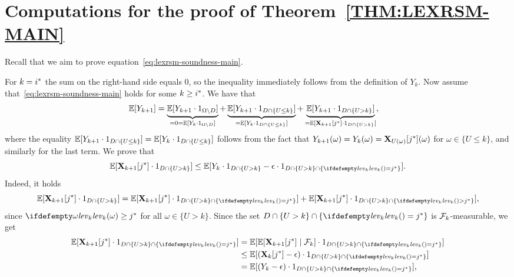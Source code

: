 
\section{Computations for the proof of Theorem~\ref{THM:LEXRSM-MAIN}}

Recall that we aim to prove equation~\eqref{eq:lexrsm-soundness-main}.

For 
$k={i}^*$ the sum on the right-hand side equals $0$, so the 
inequality immediately follows from the definition of $Y_k$. Now assume 
that~\eqref{eq:lexrsm-soundness-main} holds for some $k\geq {i}^*$. We have that 
\begin{align}
\label{eq:lexrsm-ind-1}
\mathbb{E}[Y_{k+1}] &= \underbrace{\mathbb{E}[Y_{k+1}\cdot {1}_{\Omega\setminus D}]}_{=0=\mathbb{E}[Y_k\cdot{1}_{\Omega\setminus D}]} +  \underbrace{\mathbb{E}[Y_{k+1}\cdot {1}_{D \cap \{U \leq k\}}]}_{=\mathbb{E}[Y_k\cdot{1}_{D\cap \{U\leq k\}}]} + \underbrace{\mathbb{E}[Y_{k+1}\cdot {1}_{D \cap \{U > k\}}]}_{=\mathbb{E}[\mathbf{X}_{k+1}[{j}^*]\cdot{1}_{D\cap \{U>k \} }]},
\end{align}
where the equality $\mathbb{E}[Y_{k+1}\cdot {1}_{D \cap \{U \leq k\}}] =\mathbb{E}[Y_k\cdot{1}_{D\cap \{U\leq k\}}] $ follows from the fact that $Y_{k+1}(\omega)=Y_k({\omega})=\mathbf{X}_{U(\omega)}[{j}^*](\omega)$ for $\omega\in \{U\leq k\}$, and similarly for the last term. We prove that 
\begin{equation}
\label{eq:lexrsm-ind-2}
\E[\vecseq{X}{k+1}{\fixn{j}}\cdot \indicator{D\cap \{U > k \}}] \leq \E[Y_k\cdot \indicator{D\cap \{U > k \}} -\eps\cdot \indicator{D\cap \{U>k\} \cap \{\levelrank{}{k}= \fixn{j}\} }] .
\end{equation}
Indeed, it holds
\begin{equation}
\label{eq:lexrsm-ind-3}
\E[\vecseq{X}{k+1}{\fixn{j}}\cdot \indicator{D\cap \{U > k \}}] = \E[\vecseq{X}{k+1}{\fixn{j}}\cdot \indicator{D\cap \{U > k \} \cap \{\levelrank{}{k}=\fixn{j} \} }]  + \E[\vecseq{X}{k+1}{\fixn{j}}\cdot \indicator{D\cap \{U > k \} \cap \{\levelrank{}{k}>\fixn{j}\} }], 
\end{equation}
since $\levelrank{\omega}{k}\geq \fixn{j}$ for all $\omega \in \{U>k\}$. Since the set $D\cap \{U > k \} \cap \{\levelrank{}{k}=\fixn{j} \}$ is $\mathcal{F}_k$-measurable, we get
\begin{align}
\E[\vecseq{X}{k+1}{\fixn{j}}\cdot \indicator{D\cap \{U > k \} \cap \{\levelrank{}{k}=\fixn{j} \} }] &= \E[\E[\vecseq{X}{k+1}{\fixn{j}}\mid \genfilt_k]\cdot \indicator{D\cap \{U > k \} \cap \{\levelrank{}{k}=\fixn{j} \} }] \label{eq:lexrsm-ind-4}\\
&\leq \E[(\vecseq{X}{k}{\fixn{j}} - \eps)\cdot \indicator{D\cap \{U > k \} \cap \{\levelrank{}{k}=\fixn{j} \}}] \label{eq:lexrsm-ind-5}\\
&=\E[(Y_k - \eps)\cdot \indicator{D\cap \{U > k \} \cap \{\levelrank{}{k}=\fixn{j} \}}] \label{eq:lexrsm-ind-6},
\end{align}

